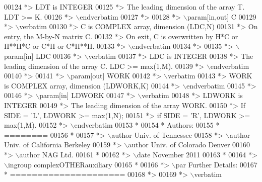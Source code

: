 \begin{DoxyCode}
00124 \textcolor{comment}{*>          LDT is INTEGER}
00125 \textcolor{comment}{*>          The leading dimension of the array T. LDT >= K.}
00126 \textcolor{comment}{*> \(\backslash\)endverbatim}
00127 \textcolor{comment}{*>}
00128 \textcolor{comment}{*> \(\backslash\)param[in,out] C}
00129 \textcolor{comment}{*> \(\backslash\)verbatim}
00130 \textcolor{comment}{*>          C is COMPLEX array, dimension (LDC,N)}
00131 \textcolor{comment}{*>          On entry, the M-by-N matrix C.}
00132 \textcolor{comment}{*>          On exit, C is overwritten by H*C or H**H*C or C*H or C*H**H.}
00133 \textcolor{comment}{*> \(\backslash\)endverbatim}
00134 \textcolor{comment}{*>}
00135 \textcolor{comment}{*> \(\backslash\)param[in] LDC}
00136 \textcolor{comment}{*> \(\backslash\)verbatim}
00137 \textcolor{comment}{*>          LDC is INTEGER}
00138 \textcolor{comment}{*>          The leading dimension of the array C. LDC >= max(1,M).}
00139 \textcolor{comment}{*> \(\backslash\)endverbatim}
00140 \textcolor{comment}{*>}
00141 \textcolor{comment}{*> \(\backslash\)param[out] WORK}
00142 \textcolor{comment}{*> \(\backslash\)verbatim}
00143 \textcolor{comment}{*>          WORK is COMPLEX array, dimension (LDWORK,K)}
00144 \textcolor{comment}{*> \(\backslash\)endverbatim}
00145 \textcolor{comment}{*>}
00146 \textcolor{comment}{*> \(\backslash\)param[in] LDWORK}
00147 \textcolor{comment}{*> \(\backslash\)verbatim}
00148 \textcolor{comment}{*>          LDWORK is INTEGER}
00149 \textcolor{comment}{*>          The leading dimension of the array WORK.}
00150 \textcolor{comment}{*>          If SIDE = 'L', LDWORK >= max(1,N);}
00151 \textcolor{comment}{*>          if SIDE = 'R', LDWORK >= max(1,M).}
00152 \textcolor{comment}{*> \(\backslash\)endverbatim}
00153 \textcolor{comment}{*}
00154 \textcolor{comment}{*  Authors:}
00155 \textcolor{comment}{*  ========}
00156 \textcolor{comment}{*}
00157 \textcolor{comment}{*> \(\backslash\)author Univ. of Tennessee }
00158 \textcolor{comment}{*> \(\backslash\)author Univ. of California Berkeley }
00159 \textcolor{comment}{*> \(\backslash\)author Univ. of Colorado Denver }
00160 \textcolor{comment}{*> \(\backslash\)author NAG Ltd. }
00161 \textcolor{comment}{*}
00162 \textcolor{comment}{*> \(\backslash\)date November 2011}
00163 \textcolor{comment}{*}
00164 \textcolor{comment}{*> \(\backslash\)ingroup complexOTHERauxiliary}
00165 \textcolor{comment}{*}
00166 \textcolor{comment}{*> \(\backslash\)par Further Details:}
00167 \textcolor{comment}{*  =====================}
00168 \textcolor{comment}{*>}
00169 \textcolor{comment}{*> \(\backslash\)verbatim}

\end{DoxyCode}
